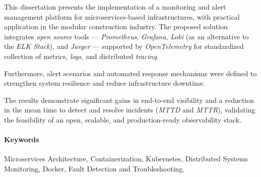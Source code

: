 This dissertation presents the implementation of a monitoring and alert management platform for microservices-based infrastructures, with practical application in the modular construction industry. The proposed solution integrates \textit{open source} tools — \textit{Prometheus}, \textit{Grafana}, \textit{Loki} (as an alternative to the \textit{ELK Stack}), and \textit{Jaeger} — supported by \textit{OpenTelemetry} for standardized collection of metrics, \textit{logs}, and distributed \textit{tracing}.

Furthermore, alert scenarios and automated response mechanisms were defined to strengthen system resilience and reduce infrastructure downtime.

The results demonstrate significant gains in end-to-end visibility and a reduction in the mean time to detect and resolve incidents (\textit{MTTD} and \textit{MTTR}), validating the feasibility of an open, scalable, and production-ready observability stack.



\paragraph{Keywords} Microservices Architecture, Containerization, Kubernetes, Distributed Systems Monitoring, Docker, Fault Detection and Troubleshooting.

\cleardoublepage
